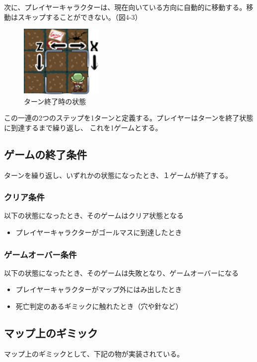 次に、プレイヤーキャラクターは、現在向いている方向に自動的に移動する。移動はスキップすることができない。（図4-3）

\begin{figure}[htbp]
  \begin{center}
    \includegraphics[bb=0 0 172 150, width=4cm]{images/43.png}
  \end{center}
  \caption{ターン終了時の状態}
  \label{fig:one}
\end{figure}

この一連の2つのステップを1ターンと定義する。プレイヤーはターンを終了状態に到達するまで繰り返し、
これを1ゲームとする。
\subsection{ゲームの終了条件}
ターンを繰り返し、いずれかの状態になったとき、１ゲームが終了する。

\subsubsection{クリア条件}
以下の状態になったとき、そのゲームはクリア状態となる
\begin{itemize}
  \item プレイヤーキャラクターがゴールマスに到達したとき
\end{itemize}

\subsubsection{ゲームオーバー条件}
以下の状態になったとき、そのゲームは失敗となり、ゲームオーバーになる
\begin{itemize}
    \item プレイヤーキャラクターがマップ外にはみ出したとき
    \item 死亡判定のあるギミックに触れたとき（穴や針など）
\end{itemize}

\subsection{マップ上のギミック}
マップ上のギミックとして、下記の物が実装されている。

